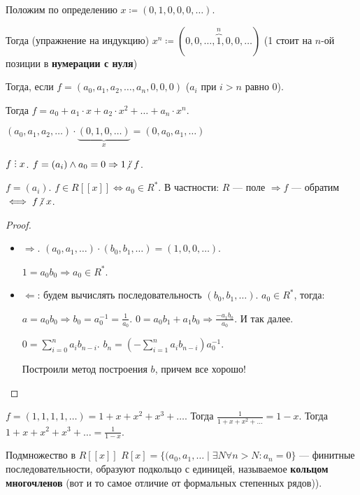 \begin{remark}
    Положим по определению $x \coloneqq (0, 1, 0, 0, 0, \ldots)$. 

    Тогда (упражнение на индукцию) $x^n \coloneqq (0, 0,\ldots, \overbrace{1}^n, 0, 0, \ldots)$ (1 стоит на $n$-ой позиции в \textbf{нумерации с нуля}) 

    Тогда, если $f= (a_0, a_1,a_2,\ldots,a_n, 0, 0, 0)$ ($a_i$ при  $i > n$ равно 0). 

    Тогда $f = a_0 + a_1 \cdot x + a_2 \cdot x^2 + \ldots + a_n \cdot x^n$. 
\end{remark}
\begin{remark}
    $(a_0, a_1, a_2,\ldots) \cdot \underbrace{(0, 1, 0,\ldots)}_{x} = (0, a_0, a_1, \ldots)$
\end{remark}
\begin{consequence}
    $f \divby x$.  $f = (a_i) \land a_0 = 0 \Rightarrow 1 \centernot \divby f$. 
\end{consequence}
\begin{theorem}
	$f = (a_i)$.  $f \in R[[x]] \iff a_0 \in R^*$. В частности: $R$ --- поле  $\Rightarrow f$ --- обратим $\iff f \centernot \divby x$. 
\end{theorem}
\begin{proof}
    \slashn
     \begin{itemize}
         \item $\Rightarrow$.  $(a_0, a_1, \ldots) \cdot (b_0, b_1, \ldots) = (1, 0, 0,\ldots)$.

             $1 = a_0b_0 \Rightarrow a_0\in R^*$.
         \item $\Leftarrow$: будем вычислять последовательность  $(b_0, b_1,\ldots)$. $a_0 \in R^*$, тогда: 

             $a = a_0b_0 \Rightarrow b_0 = a_0^{-1} = \frac{1}{a_0}$. $0 = a_0b_1 + a_1b_0 \Rightarrow \frac{-a_1b_0}{a_0}$. И так далее.

             $0 = \sum_{i=0}^n a_i b_{n-i}$.  $b_n = (-\sum_{i=1}^n a_i b_{n-i})a_0^{-1}$.  

             Построили метод построения $b$, причем все хорошо!
    \end{itemize}
\end{proof}
\begin{example}
    $f = (1, 1, 1, 1, \ldots) = 1+x+x^2+x^3+\ldots$. Тогда $\frac{1}{1+x+x^2+\ldots} = 1-x$. Тогда $1+x+x^2+x^3+\ldots = \frac{1}{1-x}$.
\end{example}
\begin{theorem}
	Подмножество в $R[[x]]$  $R[x] = \{(a_0,a_1,\ldots \mid \exists N \forall n > N\!: a_n=0\}$ --- финитные последовательности, образуют подкольцо с единицей, называемое \textbf{кольцом многочленов} (вот и то самое отличие от формальных степенных рядов)).
\end{theorem}
